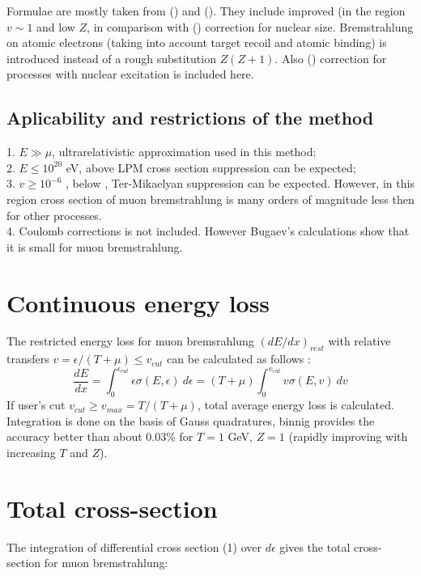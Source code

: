 Formulae are mostly taken from (\cite{brem.kel95}) and (\cite{brem.kel97}).
They include improved (in the region $v \sim 1$ and low $Z$, 
 in comparison with
(\cite{brem.petr68}) correction for nuclear size. Bremstrahlung on atomic 
electrons (taking into account target recoil and atomic binding) is
introduced instead of a rough substitution $Z(Z+1) $. Also  (\cite{brem.andr94})
correction for processes with nuclear excitation is included here.

\subsection{Aplicability and restrictions of the method}

1. $E \gg \mu $, ultrarelativistic approximation used in this method; \\
2. $E \leq 10^{20}$ eV, above LPM cross section suppression can be expected;\\
3. $v \geq 10^{-6}$ , below , Ter-Mikaelyan suppression can be expected.
However, in this region cross section of muon bremstrahlung is many
orders of magnitude less then for other processes.\\
4. Coulomb corrections is not included. However Bugaev's calculations
show that it is small for muon bremstrahlung.

\section{Continuous energy loss}

The restricted energy loss for muon bremsrahlung $(d E/ dx)_{rest}$
 with relative transfers $v = \epsilon / (T+ \mu) \leq v_{cut}$
can be calculated as follows :
$$
\frac{d E}{d x}
= \int_{0}^{\epsilon_{cut}}  \epsilon \sigma (E,\epsilon )  \: d \epsilon  =
(T+ \mu ) \int_{0}^{v_{cut}}  v \sigma (E, v )  \: d v
$$
% 
If user's cut $v_{cut} \geq v_{max}=T/(T+ \mu)$, total average 
energy loss is calculated. Integration is done on the basis of Gauss quadratures, 
binnig provides  the accuracy better
than about 0.03\% for $T = 1$ GeV, $Z=1$ (rapidly improving with increasing $T$
and $Z$).


\section{Total cross-section}

The integration of differential cross section  (1) over
$d\epsilon$ gives the total cross-section for muon bremstrahlung:

